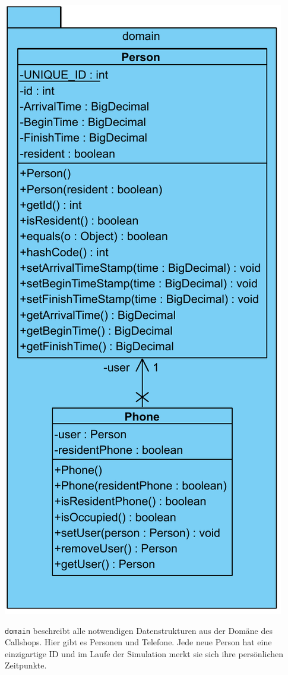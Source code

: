 \includegraphics[scale=0.5]{abbildungen/uml/domain.pdf}


\texttt{domain} beschreibt alle notwendigen Datenstrukturen aus der Domäne des Callshops. Hier gibt es Personen und Telefone. Jede neue Person hat eine einzigartige ID und im Laufe der Simulation merkt sie sich ihre persönlichen Zeitpunkte.

